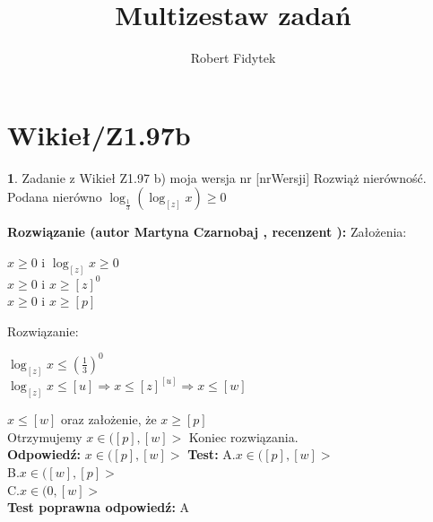 \documentclass[12pt, a4paper]{article}
\title{Multizestaw zadań}
\author{Robert Fidytek}
\date{}
\theoremstyle{definition} %
\newtheorem{zad}{}
\newcommand{\kategoria}[1]{\section{#1}} %
\newcommand{\zadStart}[1]{\begin{zad}#1\newline} %
\newcommand{\zadStop}{\end{zad}}   %
\newcommand{\rozwStart}[2]{\noindent \textbf{Rozwiązanie (autor #1 , recenzent #2): }\newline} %
\newcommand{\rozwStop}{\newline}                                            %
\newcommand{\odpStart}{\noindent \textbf{Odpowiedź:}\newline}    %
\newcommand{\odpStop}{\newline}                                             %
\newcommand{\testStart}{\noindent \textbf{Test:}\newline} %
\newcommand{\testStop}{\newline} %
\newcommand{\kluczStart}{\noindent \textbf{Test poprawna odpowiedź:}\newline} %
\newcommand{\kluczStop}{\newline} %
\begin{document}
\maketitle


\kategoria{Wikieł/Z1.97b}
\zadStart{Zadanie z Wikieł Z1.97 b) moja wersja nr [nrWersji]}
Rozwiąż nierówność.\\
Podana nierówno $ \log_\frac{1}{3} (\log_[z] x) \ge 0 $\\
\zadStop
\rozwStart{Martyna Czarnobaj}{}
Założenia:\\
\begin{center}
	$ x \ge 0$  i  $\log_[z] x \ge 0 $\\
	$ x \ge 0$  i  $x \ge [z]^{0} $\\
	$ x \ge 0$  i  $ x \ge [p] $\\
\end{center}
Rozwiązanie:
\begin{center}
	$ \log_[z] x \le (\frac{1}{3})^{0} $\\
	$ \log_[z] x \le [u] \Rightarrow x \le [z]^{[u]} \Rightarrow x \le [w] $\\
\end{center}
$x \le [w]$ oraz założenie, że $ x \ge [p] $\\
Otrzymujemy $ x \in ([p],[w]> $
Koniec rozwiązania.\\
\rozwStop
\odpStart
$ x \in ([p],[w]> $
\odpStop
\testStart
A.$ x \in ([p],[w]> $\\
B.$ x \in ([w],[p]> $\\
C.$ x \in (0,[w]> $\\
\testStop
\kluczStart
A
\kluczStop
\end{document}
